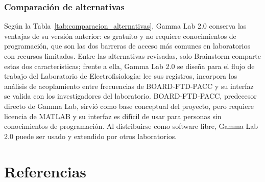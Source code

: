 \documentclass[12pt,letterpaper]{article}
\begin{document}
\subsubsection{Comparación de alternativas}

\begin{table}[h!]
\centering
\renewcommand{\arraystretch}{1.3}
\caption{Comparación de alternativas para análisis de señales neurofisiológicas}
\label{tab:comparacion_alternativas}
\end{table}

Según la Tabla~\ref{tab:comparacion_alternativas}, Gamma Lab 2.0 conserva las ventajas de su versión anterior: es gratuito y no requiere conocimientos de programación, que son las dos barreras de acceso más comunes en laboratorios con recursos limitados. Entre las alternativas revisadas, solo Brainstorm comparte estas dos características; frente a ella, Gamma Lab 2.0 se diseña para el flujo de trabajo del Laboratorio de Electrofisiología: lee sus registros, incorpora los análisis de acoplamiento entre frecuencias de BOARD-FTD-PACC y su interfaz se valida con los investigadores del laboratorio.
BOARD-FTD-PACC, predecesor directo de Gamma Lab, sirvió como base conceptual del proyecto, pero requiere licencia de MATLAB y su interfaz es difícil de usar para personas sin conocimientos de programación.
Al distribuirse como software libre, Gamma Lab 2.0 puede ser usado y extendido por otros laboratorios.


\section{Referencias}
\printbibliography[heading=none]
\end{document}
